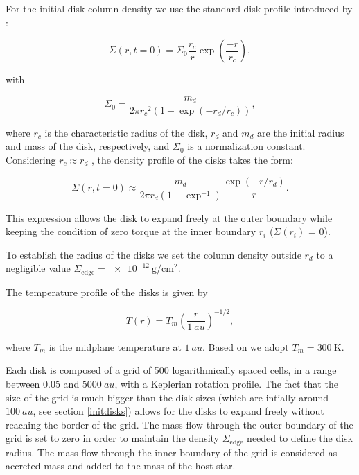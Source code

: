 \documentclass[fleqn,usenatbib]{mnras}
\begin{document}
For the initial disk column density we use the standard disk profile introduced by \citet{lynden-bell1974}:

\begin{equation}\label{profile}
\Sigma(r, t=0) = \Sigma_0 \frac{r_c}{r} \exp\left(\frac{-r}{r_c}\right),
\end{equation}

\noindent
with

\begin{equation}
\Sigma_0 = \frac{m_d}{2 \pi {r_c}^2 \left(1 - \exp\left(-r_d/r_c\right)\right)},
\end{equation}

\noindent
where $r_c$ is the characteristic radius of the disk, $r_d$ and $m_d$ are the initial radius and mass of the disk, respectively, and $\Sigma_0$ is a normalization constant. Considering $r_c \approx r_d$ \citep{anderson2013}, the density profile of the disks takes the form:

\begin{equation}
\Sigma(r, t=0) \approx \frac{m_d}{2 \pi r_d \left(1 - \exp^{-1}\right)} \frac{\exp(-r/r_d)}{r}.
\end{equation}

This expression allows the disk to expand freely at the outer boundary while keeping the condition of zero torque at the inner boundary $r_i$ ($\Sigma(r_i)$ = 0).

To establish the radius of the disks we set the column density outside $r_d$ to a negligible value $\Sigma_{\mathrm{edge}} = \SI{e-12}{\gram\per\square\cm}$. 

The temperature profile of the disks is given by

\begin{equation}
T(r) = T_m \left(\frac{r}{\SI{1}{au}}\right)^{-1/2},
\end{equation}

\noindent
where $T_m$ is the midplane temperature at $\SI{1}{au}$. Based on \citet{anderson2013} we adopt $T_m = \SI{300}{\K}$.

Each disk is composed of a grid of 500 logarithmically spaced cells, in a range between $0.05$ and $\SI{5000}{au}$, with a Keplerian rotation profile. The fact that the size of the grid is much bigger than the disk sizes (which are intially around $\SI{100}{au}$, see section \ref{initdisks}) allows for the disks to expand freely without reaching the border of the grid. The mass flow through the outer boundary of the grid is set to zero in order to maintain the density $\Sigma_{\mathrm{edge}}$ needed to define the disk radius. The mass flow through the inner boundary of the grid is considered as accreted mass and added to the mass of the host star.
\end{document}
